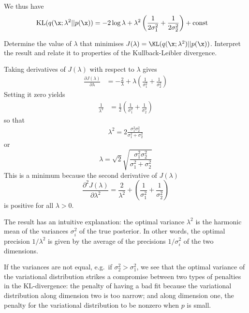 \begin{exenumerate}
\begin{solution}
    We thus have
    \begin{align}
      \text{KL}(q(\x; \lambda^2 || p(\x))  & =  -2 \log \lambda + \lambda^2\left(\frac{1}{2\sigma_1^2}+\frac{1}{2\sigma_2^2}\right)+\text{const}
    \end{align}    
    
  \end{solution}


  
\item Determine the value of $\lambda$ that minimises $J(\lambda) =
  \KL(q(\x; \lambda^2) || p(\x))$. Interpret the result and
  relate it to properties of the Kullback-Leibler
  divergence.

  \begin{solution}

    Taking derivatives of $J(\lambda)$ with respect to $\lambda$ gives
    \begin{align}
      \frac{\partial J(\lambda)}{\partial \lambda} & = -\frac{2}{\lambda} + \lambda \left(\frac{1}{\sigma_1^2}+\frac{1}{\sigma_2^2}\right)
      \end{align}
    Setting it zero yields
    \begin{align}
      \frac{1}{\lambda^2} &= \frac{1}{2}\left(\frac{1}{\sigma_1^2}+\frac{1}{\sigma_2^2}\right)
    \end{align}
    so that
    \begin{align}
      \lambda^2 = 2 \frac{\sigma_1^2 \sigma_2^2}{\sigma_1^2+\sigma_2^2}
    \end{align}
    or
    \begin{equation}
    \lambda = \sqrt{2} \sqrt{\frac{\sigma_1^2 \sigma_2^2}{\sigma_1^2+\sigma_2^2}}
    \end{equation}
    This is a minimum because the second derivative of
    $J(\lambda)$
    \begin{equation}
      \frac{\partial^2 J(\lambda)}{\partial \lambda^2} = \frac{2}{\lambda^2} + \left(\frac{1}{\sigma_1^2}+\frac{1}{\sigma_2^2}\right)
    \end{equation}
    is positive for all $\lambda > 0$.
    
    The result has an intuitive explanation: the optimal variance
    $\lambda^2$ is the harmonic mean of the variances $\sigma_i^2$ of
    the true posterior. In other words, the optimal precision
    $1/\lambda^2$ is given by the average of the precisions
    $1/\sigma_i^2$ of the two dimensions.

    If the variances are not equal, e.g.\ if $\sigma_2^2 >
    \sigma_1^2$, we see that the optimal variance of the variational
    distribution strikes a compromise between two types of penalties
    in the KL-divergence: the penalty of having a bad fit because the
    variational distribution along dimension two is too narrow; and
    along dimension one, the penalty for the variational distribution
    to be nonzero when $p$ is small. 

  \end{solution}
  
\end{exenumerate}


